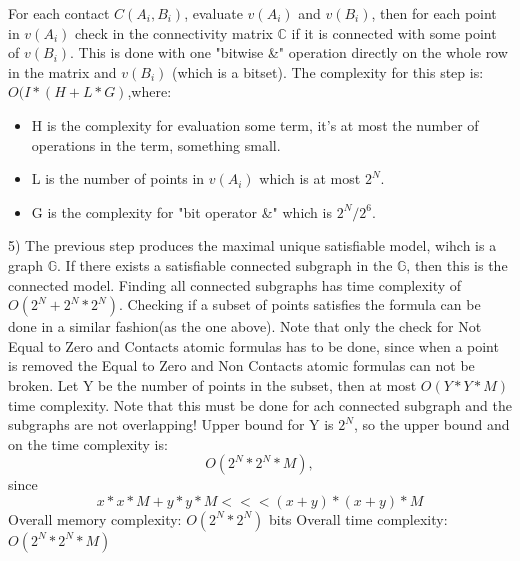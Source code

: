 \documentclass{article}
\begin{document}
			For each contact $C(A_i, B_i)$, evaluate $v(A_i)$ and $v(B_i)$, 
			then for each point in $v(A_i)$ check in the connectivity matrix $\mathbb{C}$
			if it is connected with some point of $v(B_i)$.
			This is done with one "bitwise \&" operation directly on the whole row in 
			the matrix and $v(B_i)$ (which is a bitset).
			\newline
			The complexity for this step is: $O(I * (H + L * G)$,where: 
			\begin{itemize}
				\item H is the complexity for evaluation some term, 
					it's at most the number of operations in the term, something small.
				\item L is the number of points in $v(A_i)$ which is at most $2^N$.
			       \item G is the complexity for "bit operator \&" which is $2^N/2^6$.
			\end{itemize}
		5) The previous step produces the maximal unique satisfiable model, wihch is a graph $\mathbb{G}$.
			If there exists a satisfiable connected subgraph in the $\mathbb{G}$, then this is the connected model.
			Finding all connected subgraphs has time complexity of $O(2^N + 2^N * 2^N)$.
			Checking if a subset of points satisfies the formula can be done in a similar fashion(as the one above).
			\newline
			Note that only the check for Not Equal to Zero and Contacts atomic formulas has to be done, 
			since when a point is removed the  Equal to Zero and Non Contacts atomic formulas can not be broken.
			\newline
			Let Y be the number of points in the subset, then at most $O(Y * Y * M)$ time complexity.
			Note that this must be done for ach connected subgraph and the subgraphs are not overlapping!
			Upper bound for Y is $2^N$, so the upper bound and on the time complexity is: 
			\begin{equation*}
				O(2^N * 2^N * M),
			\end{equation*}
			since 
			\begin{equation*}
				x * x * M + y * y * M <<< (x+y)*(x+y)*M
			\end{equation*}
			\newline
			\newline	
		Overall memory complexity: $O(2^N * 2^N)$ bits
		\newline
		Overall time complexity: $O(2^N * 2^N * M)$
\end{document}

